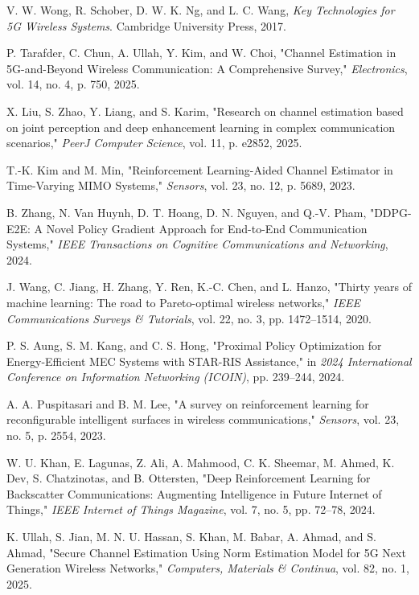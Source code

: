 \documentclass[journal,twocolumn]{IEEEtran}
\begin{document}
\begin{thebibliography}{30} %

V. W. Wong, R. Schober, D. W. K. Ng, and L. C. Wang, \emph{Key Technologies for 5G Wireless Systems}. Cambridge University Press, 2017.

P. Tarafder, C. Chun, A. Ullah, Y. Kim, and W. Choi, "Channel Estimation in 5G-and-Beyond Wireless Communication: A Comprehensive Survey," \emph{Electronics}, vol. 14, no. 4, p. 750, 2025.

X. Liu, S. Zhao, Y. Liang, and S. Karim, "Research on channel estimation based on joint perception and deep enhancement learning in complex communication scenarios," \emph{PeerJ Computer Science}, vol. 11, p. e2852, 2025.

T.-K. Kim and M. Min, "Reinforcement Learning-Aided Channel Estimator in Time-Varying MIMO Systems," \emph{Sensors}, vol. 23, no. 12, p. 5689, 2023.

B. Zhang, N. Van Huynh, D. T. Hoang, D. N. Nguyen, and Q.-V. Pham, "DDPG-E2E: A Novel Policy Gradient Approach for End-to-End Communication Systems," \emph{IEEE Transactions on Cognitive Communications and Networking}, 2024.

J. Wang, C. Jiang, H. Zhang, Y. Ren, K.-C. Chen, and L. Hanzo, "Thirty years of machine learning: The road to Pareto-optimal wireless networks," \emph{IEEE Communications Surveys \& Tutorials}, vol. 22, no. 3, pp. 1472--1514, 2020.

P. S. Aung, S. M. Kang, and C. S. Hong, "Proximal Policy Optimization for Energy-Efficient MEC Systems with STAR-RIS Assistance," in \emph{2024 International Conference on Information Networking (ICOIN)}, pp. 239--244, 2024.

A. A. Puspitasari and B. M. Lee, "A survey on reinforcement learning for reconfigurable intelligent surfaces in wireless communications," \emph{Sensors}, vol. 23, no. 5, p. 2554, 2023.

W. U. Khan, E. Lagunas, Z. Ali, A. Mahmood, C. K. Sheemar, M. Ahmed, K. Dev, S. Chatzinotas, and B. Ottersten, "Deep Reinforcement Learning for Backscatter Communications: Augmenting Intelligence in Future Internet of Things," \emph{IEEE Internet of Things Magazine}, vol. 7, no. 5, pp. 72--78, 2024.

K. Ullah, S. Jian, M. N. U. Hassan, S. Khan, M. Babar, A. Ahmad, and S. Ahmad, "Secure Channel Estimation Using Norm Estimation Model for 5G Next Generation Wireless Networks," \emph{Computers, Materials \& Continua}, vol. 82, no. 1, 2025.


\end{thebibliography}
\end{document}
